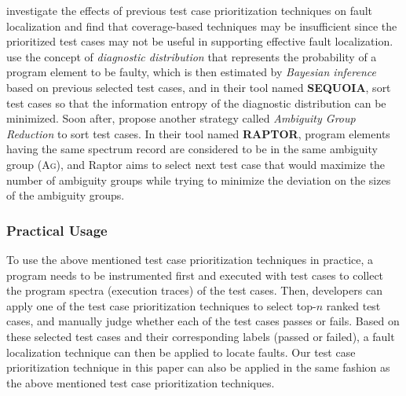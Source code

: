 \citet{JiangCT11} investigate the effects of previous test case prioritization techniques on fault localization and find that coverage-based techniques may be insufficient since the prioritized test cases may not be useful in supporting effective fault localization.
\cite{Gonzalez-SanchezPAGG11} use the concept of {\em diagnostic distribution} that represents the probability of a program element to be faulty, which is then estimated by {\em Bayesian inference} based on previous selected test cases, and in their tool named \textbf{S{\scriptsize EQUOIA}}, sort test cases so that the information entropy of the diagnostic distribution can be minimized.
%
%
%
Soon after, \cite{Alberto2011} propose another strategy
called {\em Ambiguity Group Reduction} to sort test cases.
In their tool named \textbf{R{\scriptsize APTOR}}, program elements having the same spectrum record are considered to be in the same ambiguity group (\textsc{Ag}),
and {\sc Raptor} aims to select next test case that would maximize the number of ambiguity groups while trying to minimize the deviation on the sizes of the ambiguity groups.

\subsubsection{Practical Usage}

To use the above mentioned test case prioritization techniques in practice, a program needs to be instrumented first and executed with test cases to collect the program spectra (execution traces) of the test cases. Then, developers can apply one of the test case prioritization techniques to select top-$n$ ranked test cases, and manually judge whether each of the test cases passes or fails. Based on these selected test cases and their corresponding labels (passed or failed), a fault localization technique \citep[e.g.][]{NainarCRL07,JH05} can then be applied to locate faults. Our test case prioritization technique in this paper can also be applied in the same fashion as the above mentioned test case prioritization techniques.
